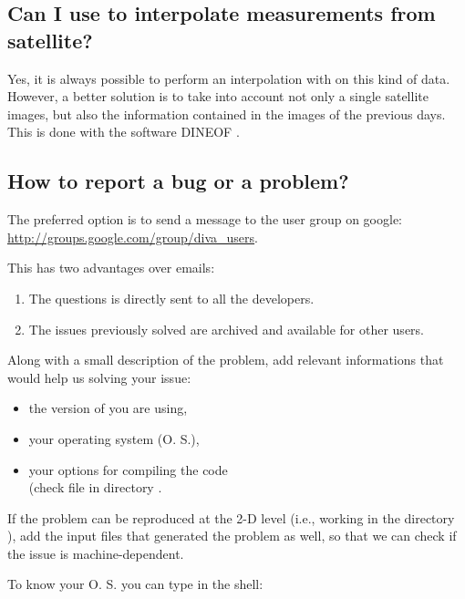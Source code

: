 \subsection{Can I use \diva to interpolate measurements from satellite?}

Yes, it is always possible to perform an interpolation with \diva on this kind of data. However, a better solution is to take into account not only a single satellite images, but also the information contained in the images of the previous days. This is done with the software DINEOF \citep[e.g.,][or \url{http://modb.oce.ulg.ac.be/mediawiki/index.php/DINEOF}] {ALVERA05,BECKERS06}. 



\subsection{How to report a bug or a problem?}

The preferred option is to send a message to the \diva user group on google:\\
 \url{http://groups.google.com/group/diva_users}. 
 
This has two advantages over emails:
\begin{enumerate}
\item The questions is directly sent to all the \diva developers.
\item The issues previously solved are archived and available for other users.
\end{enumerate}

Along with a small description of the problem, add relevant informations that would help us solving your issue:
\begin{itemize}
\item the version of \diva you are using,
\item your operating system (O. S.),
\item your options for compiling the code\\
 (check file  in directory .
\end{itemize}
If the problem can be reproduced at the 2-D level (i.e., working in the directory ), add the input files that generated the problem as well, so that we can check if the issue is machine-dependent. 

To know your O. S. you can type in the shell:

